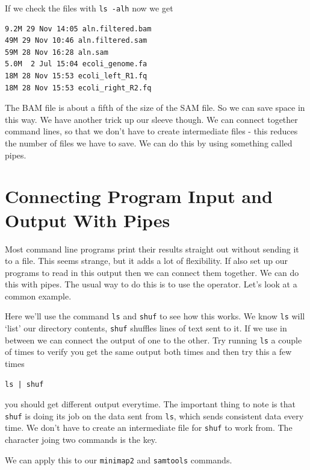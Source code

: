 \documentclass[]{book}
\begin{document}
If we check the files with \texttt{ls\ -alh} now we get

\begin{verbatim}
9.2M 29 Nov 14:05 aln.filtered.bam
49M 29 Nov 10:46 aln.filtered.sam
59M 28 Nov 16:28 aln.sam
5.0M  2 Jul 15:04 ecoli_genome.fa
18M 28 Nov 15:53 ecoli_left_R1.fq
18M 28 Nov 15:53 ecoli_right_R2.fq
\end{verbatim}

The BAM file is about a fifth of the size of the SAM file. So we can save space in this way. We have another trick up our sleeve though. We can connect together command lines, so that we don't have to create intermediate files - this reduces the number of files we have to save. We can do this by using something called pipes.

\hypertarget{connecting-program-input-and-output-with-pipes}{%
\section{Connecting Program Input and Output With Pipes}\label{connecting-program-input-and-output-with-pipes}}

Most command line programs print their results straight out without sending it to a file. This seems strange, but it adds a lot of flexibility. If also set up our programs to read in this output then we can connect them together. We can do this with pipes. The usual way to do this is to use the \texttt{\textbar{}} operator. Let's look at a common example.

Here we'll use the command \texttt{ls} and \texttt{shuf} to see how this works. We know \texttt{ls} will `list' our directory contents, \texttt{shuf} shuffles lines of text sent to it. If we use \texttt{\textbar{}} in between we can connect the output of one to the other. Try running \texttt{ls} a couple of times to verify you get the same output both times and then try this
a few times

\begin{verbatim}
ls | shuf
\end{verbatim}

you should get different output everytime. The important thing to note is that \texttt{shuf} is doing its job on the data sent from \texttt{ls}, which sends consistent data every time. We don't have to create an intermediate file for \texttt{shuf} to work from. The \texttt{\textbar{}} character joing two commands is the key.

We can apply this to our \texttt{minimap2} and \texttt{samtools} commands.
\end{document}
